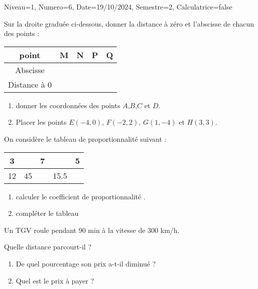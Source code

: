 \documentclass[a4paper,12pt]{article}
\begin{document}
\begin{Maquette}[DS]{Niveau=1, Numero=6, Date=19/10/2024, Semestre=2, Calculatrice=false}
\begin{exercice}
Sur la droite graduée ci-dessous, donner la distance à zéro et l’abscisse de chacun des points   :


\begin{tabular}{|c|c|c|c|c|}
\hline 
point & M & N & P & Q \\ 
\hline 
Abscisse &  &  &  &  \\ 
\hline 
Distance à 0 &  &  &  &  \\ 
\hline 
\end{tabular} 
\begin{enumerate}
\item donner les coordonnées des points $A$,$B$,$C$ et $D$.
\item Placer les points $E(-4, 0)$, $F(-2, 2)$, $G(1, -4)$ et $H(3, 3)$.
\end{enumerate}
\begin{AffRepere}
\end{AffRepere}
\end{exercice}

\begin{exercice}
On considère le tableau de proportionnalité suivant :
\begin{tabular}{|c|c|c|c|c|}
\hline 
3 &  & 7 &  & 5 \\ 
\hline 
12 & 45 &  & 15.5 &  \\ 
\hline 
\end{tabular} 
\begin{enumerate}
\item calculer le coefficient de proportionnalité .
\item compléter le tableau 
\end{enumerate}
\end{exercice}


\begin{exercice}
Un TGV roule pendant 90 min  à la vitesse de 300 km/h.

Quelle distance parcourt-il ?
\end{exercice}

\begin{exercice}
\begin{enumerate}
\item  De quel pourcentage son prix a-t-il diminué ?
\item Quel est le prix à payer ?
\end{enumerate}
\end{exercice}

\end{Maquette}
\end{document}
